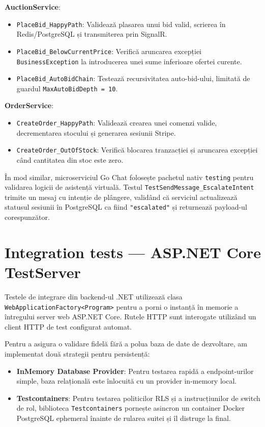 \textbf{AuctionService}:
\begin{itemize}
    \item \texttt{PlaceBid\_HappyPath}: Validează plasarea unui bid valid, scrierea în Redis/PostgreSQL și transmiterea prin SignalR.
    \item \texttt{PlaceBid\_BelowCurrentPrice}: Verifică aruncarea excepției \texttt{BusinessException} la introducerea unei sume inferioare ofertei curente.
    \item \texttt{PlaceBid\_AutoBidChain}: Testează recursivitatea auto-bid-ului, limitată de guardul \texttt{MaxAutoBidDepth = 10}.
\end{itemize}

\textbf{OrderService}:
\begin{itemize}
    \item \texttt{CreateOrder\_HappyPath}: Validează crearea unei comenzi valide, decrementarea stocului și generarea sesiunii Stripe.
    \item \texttt{CreateOrder\_OutOfStock}: Verifică blocarea tranzacției și aruncarea excepției când cantitatea din stoc este zero.
\end{itemize}

În mod similar, microserviciul Go Chat folosește pachetul nativ \texttt{testing} pentru validarea logicii de asistență virtuală. Testul \texttt{TestSendMessage\_EscalateIntent} trimite un mesaj cu intenție de plângere, validând că serviciul actualizează statusul sesiunii în PostgreSQL ca fiind \texttt{"escalated"} și returnează payload-ul corespunzător.

\section{Integration tests --- ASP.NET Core TestServer}

Testele de integrare din backend-ul .NET utilizează clasa \texttt{WebApplicationFactory<Program>} pentru a porni o instanță în memorie a întregului server web ASP.NET Core. Rutele HTTP sunt interogate utilizând un client HTTP de test configurat automat.

Pentru a asigura o validare fidelă fără a polua baza de date de dezvoltare, am implementat două strategii pentru persistență:
\begin{itemize}
    \item \textbf{InMemory Database Provider}: Pentru testarea rapidă a endpoint-urilor simple, baza relațională este înlocuită cu un provider in-memory local.
    \item \textbf{Testcontainers}: Pentru testarea politicilor RLS și a instrucțiunilor de switch de rol, biblioteca \texttt{Testcontainers} \cite{testcontainers2026docs} pornește asincron un container Docker PostgreSQL ephemeral înainte de rularea suitei și îl distruge la final.
\end{itemize}

